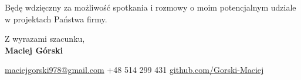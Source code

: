 \documentclass[11pt,a4paper]{article}
\begin{document}
\begin{minipage}[t]{0.68\paperwidth}
\begin{minipage}[t]{0.9\textwidth}
\vspace{0.4em}

Będę wdzięczny za możliwość spotkania i rozmowy o moim potencjalnym udziale w projektach Państwa firmy.

\vspace{1em}

Z wyrazami szacunku,\\[0.4em]
{\bfseries\color{sidebar} Maciej Górski}

\vspace{0.2em}
{\footnotesize\color{mutedText}
\hspace{0.3em}\href{mailto:maciejgorski978@gmail.com}{maciejgorski978@gmail.com} \hspace{1em}
\hspace{0.3em}+48 514 299 431 \hspace{1em}
\hspace{0.3em}\href{https://github.com/Gorski-Maciej}{github.com/Gorski-Maciej}
}

\end{minipage}
\end{minipage}
\end{document}

